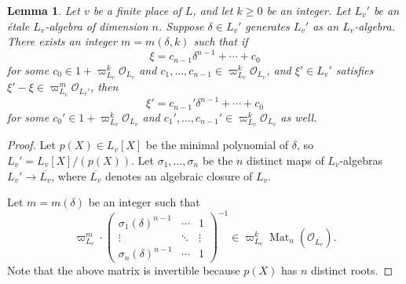 \documentclass[11pt, reqno]{amsart}
\numberwithin{equation}{subsection}
\theoremstyle{plain}
\newtheorem{lem}[proposition]{Lemma}
\theoremstyle{definition}
\renewcommand{\O}{\mathcal O}
\newcommand{\ol}{\overline}
\DeclareMathOperator{\Mat}{Mat}
\begin{document}
\begin{lem}
\label{lem:kottwitzapprox}
Let $v$ be a finite place of $L$, and let $k \ge 0$ be
an integer. Let $L_v'$ be an \'etale $L_v$-algebra
of dimension $n$.
Suppose $\delta \in L_v'$ generates $L_v'$ as an
$L_v$-algebra. 
There exists an integer $m = m(\delta, k)$ such that if 
\[
    \xi = c_{n-1}\delta^{n-1} + \cdots + c_0
\]
for some $c_0 \in 1 + \varpi_{L_v}^k\O_{L_v}$
and $c_1, \dots, c_{n-1} \in \varpi_{L_v}^k\O_{L_v}$,
and $\xi' \in L_v'$ satisfies 
$\xi' - \xi \in \varpi_{L_v}^m \O_{L_v'}$, then
\[
    \xi' = c_{n-1}'\delta^{n-1} + \cdots + c_0
\]
for some $c_0' \in 1 + \varpi_{L_v}^k\O_{L_v}$
and $c_1', \dots, c_{n-1}' \in \varpi_{L_v}^k\O_{L_v}$ 
as well.

\end{lem}
\begin{proof}
Let $p(X) \in L_v[X]$ be the minimal polynomial of 
$\delta$, so $L_v' = L_v[X]/(p(X))$. 
Let $\sigma_1, \dots, \sigma_n$ be the $n$
distinct maps of $L_v$-algebras $L_v' \to \ol{L_v}$,
where $\ol{L_v}$ denotes an algebraic closure of $L_v$.

Let $m = m(\delta)$ be an integer such that
\begin{equation}
\label{eq:m} 
    \varpi_{L_v}^m \cdot \begin{pmatrix}
        \sigma_1(\delta)^{n-1} & \cdots & 1 \\
        \vdots & \ddots & \vdots \\
        \sigma_n(\delta)^{n-1} & \cdots & 1
    \end{pmatrix}^{-1} 
    \in \varpi_{L_v}^k \Mat_n(\O_{\ol{L_v}}).
\end{equation} 
Note that the above matrix is invertible because 
$p(X)$ has $n$ distinct roots.


\end{proof}
\end{document}
